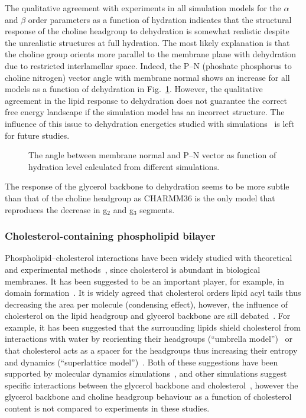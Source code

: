 \documentclass[pre,aps,floatfix,authordate1-4,twocolumn]{revtex4-1}
\begin{document}
The qualitative agreement with experiments in all simulation models for the $\alpha$ and $\beta$ order parameters  
as a function of hydration indicates that the structural response of the choline headgroup to dehydration is somewhat realistic
despite the unrealistic structures at full hydration. 
The most likely explanation is that the choline group
orients more parallel to the membrane plane with dehydration due to restricted interlamellar space. 
Indeed, the P--N (phoshate phosphorus to choline nitrogen) vector angle with membrane normal shows an increase for
all models as a function of dehydration in Fig.~\ref{PNangle}.
However, the qualitative agreement in the lipid response to dehydration does not guarantee the correct 
free energy landscape if the simulation model has an incorrect structure. The influence of this issue to 
dehydration energetics studied with simulations~\cite{eun09,schneck12} is left for future studies.
\begin{figure}[]
  \centering

  \caption{\label{PNangle}
    The angle between membrane normal and P--N vector as function of
    hydration level calculated from different simulations.
  }
\end{figure}

The response of the glycerol backbone to dehydration seems to be more subtle than that of the choline headgroup 
as CHARMM36 is the only model that reproduces the decrease in g$_2$ and g$_3$ segments.


\subsubsection{Cholesterol-containing phospholipid bilayer}
Phospholipid--cholesterol interactions have been widely studied with theoretical~\cite{huang99,zhu07,rog09,alwarawrah12} and
experimental methods~\cite{brown78,marsh10,ferreira13,marsh13}, since cholesterol is abundant in biological membranes.
It has been suggested to be an important player, for example, in domain formation~\cite{simons04,somerharju09}.
It is widely agreed that cholesterol orders lipid acyl tails thus decreasing the area per molecule (condensing effect),
however, the influence of cholesterol on the lipid headgroup and glycerol backbone are sill debated~\cite{huang99,simons04,somerharju09}.
For example, it has been suggested that the surrounding lipids shield cholesterol from interactions with water by 
reorienting their headgroups (``umbrella model'')~\cite{huang99} or that cholesterol acts as a spacer for the headgroups thus increasing 
their entropy and dynamics (``superlattice model'')~\cite{somerharju09}. 
Both of these suggestions have been supported
by molecular dynamics simulations~\cite{zhu07,alwarawrah12}, and other simulations suggest specific
interactions between the glycerol backbone and cholesterol~\cite{rog09}, however the glycerol backbone and choline headgroup behaviour
as a function of cholesterol content is not compared to experiments in these studies. 
\end{document}
